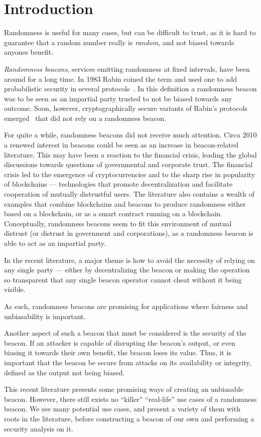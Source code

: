 \section{Introduction}
Randomness is useful for many cases, but can be difficult to trust, as it is hard to guarantee that a random number really is \emph{random}, and not biased towards anyones benefit.

\emph{Randomness beacons}, services emitting randomness at fixed intervals, have been around for a long time.
In 1983 Rabin coined the term and used one to add probabilistic security in several protocols~\cite{rabin1983transaction}.
In this definition a randomness beacon was to be seen as an impartial party trusted to not be biased towards any outcome.
Soon, however, cryptographically secure variants of Rabin's protocols emerged~ that did not rely on a randomness beacon.

For quite a while, randomness beacons did not receive much attention.
Circa 2010 a renewed interest in beacons could be seen as an increase in beacon-related literature.
This may have been a reaction to the financial crisis, leading the global discussions towards questions of governmental and corporate trust.
The financial crisis led to the emergence of cryptocurrencies and to the sharp rise in popularity of blockchains --- technologies that promote decentralization and facilitate cooperation of mutually distrustful users.
The literature also contains a wealth of examples that combine blockchains and beacons to produce randomness either based on a blockchain, or as a smart contract running on a blockchain.
Conceptually, randomness beacons seem to fit this environment of mutual distrust (or distrust in government and corporations), as a randomness beacon is able to act as an impartial party.

In the recent literature, a major theme is how to avoid the necessity of relying on any single party --- either by decentralizing the beacon or making the operation so transparent that any single beacon operator cannot cheat without it being visible.

As such, randomness beacons are promising for applications where fairness and unbiasability is important.

Another aspect of such a beacon that must be considered is the security of the beacon.
If an attacker is capable of disrupting the beacon's output, or even biasing it towards their own benefit, the beacon loses its value.
Thus, it is important that the beacon be secure from attacks on its availability or integrity, defined as the output not being biased.

This recent literature presents some promising ways of creating an unbiasable beacon.  However, there still exists no \enquote{killer} \enquote{real-life} use cases of a randomness beacon.
We see many potential use cases, and present a variety of them with roots in the literature, before constructing a beacon of our own and performing a security analysis on it.


